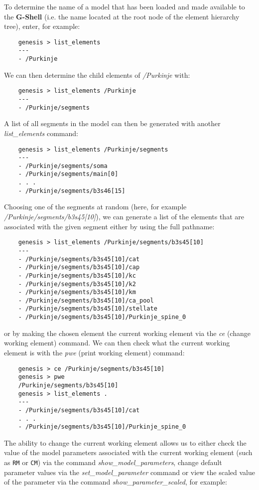 \documentclass[12pt]{article}
\begin{document}
To determine the name of a model that has been loaded and made available to the {\bf G-Shell} (i.e. the name located at the root node of the element hierarchy tree), enter, for example: 
\begin{verbatim}
    genesis > list_elements
    ---
    - /Purkinje
\end{verbatim}
We can then determine the child elements of {\it /Purkinje} with:
\begin{verbatim}
    genesis > list_elements /Purkinje
    ---
    - /Purkinje/segments
\end{verbatim}
A list of all segments in the model can then be generated with another {\it list\_elements} command:
\begin{verbatim}
    genesis > list_elements /Purkinje/segments
    ---
    - /Purkinje/segments/soma
    - /Purkinje/segments/main[0]
    . . .
    - /Purkinje/segments/b3s46[15]
\end{verbatim}
Choosing one of the segments at random (here, for example {\it /Purkinje/segments/b3s45[10]}), we can generate a list of the elements that are associated with the given segment either by using the full pathname:
\begin{verbatim}
    genesis > list_elements /Purkinje/segments/b3s45[10]
    ---
    - /Purkinje/segments/b3s45[10]/cat
    - /Purkinje/segments/b3s45[10]/cap
    - /Purkinje/segments/b3s45[10]/kc
    - /Purkinje/segments/b3s45[10]/k2
    - /Purkinje/segments/b3s45[10]/km
    - /Purkinje/segments/b3s45[10]/ca_pool
    - /Purkinje/segments/b3s45[10]/stellate
    - /Purkinje/segments/b3s45[10]/Purkinje_spine_0
\end{verbatim}
or by making the chosen element the current working element via the {\it ce} (change working element) command. We can then check what the current working element is with the {\it pwe} (print working element) command:
\begin{verbatim}
    genesis > ce /Purkinje/segments/b3s45[10]
    genesis > pwe
    /Purkinje/segments/b3s45[10]
    genesis > list_elements .
    ---
    - /Purkinje/segments/b3s45[10]/cat
    . . .
    - /Purkinje/segments/b3s45[10]/Purkinje_spine_0
\end{verbatim}
The ability to change the current working element allows us to either check the value of the model parameters associated with the current working element (such as {\tt RM} or {\tt CM}) via the command {\it show\_model\_parameters}, change default parameter values via the {\it set\_model\_parameter} command or view the scaled value of the parameter via the command {\it show\_parameter\_scaled}, for example:
\end{document}
